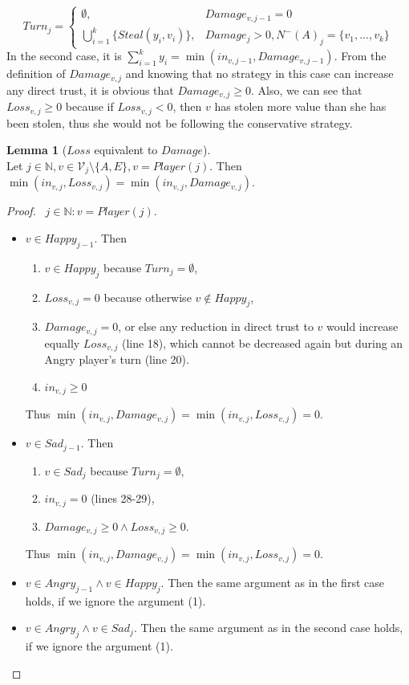 \documentclass[11pt]{article}
\theoremstyle{definition}
\theoremstyle{corollary}
\theoremstyle{lemma}
\newtheorem{lemma}{Lemma}[section]
\begin{document}
    $$Turn_j =
      \begin{cases}
         \emptyset, & Damage_{v,j-1} = 0 \\
         \bigcup\limits_{i=1}^{k}\{Steal(y_i,v_i)\}, & Damage_j > 0, N^{-}(A)_j = \{v_1,...,v_k\}
      \end{cases}$$
    In the second case, it is $\sum\limits_{i=1}^{k}y_i = \min(in_{v, j-1}, Damage_{v, j-1})$. From the
    definition of $Damage_{v,j}$ and knowing that no strategy in this case can increase any direct trust, it is obvious
    that $Damage_{v,j} \geq 0$. Also, we can see that $Loss_{v,j} \geq 0$
    because if $Loss_{v,j} < 0$, then $v$ has stolen more value than she has been stolen, thus she would not be following the
    conservative strategy.
    \begin{lemma}[$Loss$ equivalent to $Damage$] \ \\
       Let $j \in \mathbb{N}, v \in \mathcal{V}_j \setminus \{A, E\}, v = Player(j)$. Then $\min(in_{v, j}, Loss_{v, j}) = 
       \min(in_{v, j}, Damage_{v, j})$.
    \end{lemma}
    \begin{proof} \ 
       $j \in \mathbb{N}: v = Player(j)$.
       \begin{itemize}
          \item $v \in Happy_{j-1}$. Then
          \begin{enumerate}
             \item $v \in Happy_j$ because $Turn_{j} = \emptyset$,
             \item $Loss_{v, j} = 0$ because otherwise $v \notin Happy_j$,
             \item $Damage_{v, j} = 0$, or else any reduction in direct trust to $v$ would increase equally
             $Loss_{v, j}$ (line 18), which cannot be decreased again but during an Angry player's turn (line 20).
             \item $in_{v, j} \geq 0$
          \end{enumerate}
          Thus $\min(in_{v, j}, Damage_{v,j}) = \min(in_{v, j}, Loss_{v,j}) = 0$.
          \item $v \in Sad_{j-1}$. Then
          \begin{enumerate}
             \item $v \in Sad_j$ because $Turn_{j} = \emptyset$, 
             \item $in_{v, j} = 0$ (lines 28-29),
             \item $Damage_{v, j} \geq 0 \wedge Loss_{v, j} \geq 0$.
          \end{enumerate}
          Thus $\min(in_{v, j}, Damage_{v,j}) = \min(in_{v, j}, Loss_{v,j}) = 0$.
          \item $v \in Angry_{j-1} \wedge v \in Happy_j$. Then the same argument as in the first case holds, if
          we ignore the argument (1).
          \item $v \in Angry_j \wedge v \in Sad_j$. Then the same argument as in the second case holds, if 
          we ignore the argument (1).
       \end{itemize}
    \end{proof}
\end{document}
